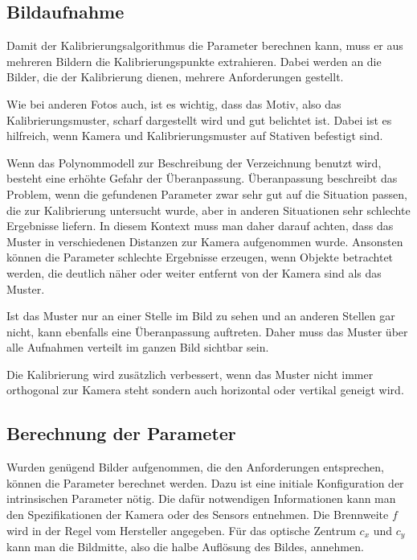 \subsection{Bildaufnahme} %
\label{sub:bildaufnahme}
Damit der Kalibrierungsalgorithmus die Parameter berechnen kann, muss er aus mehreren Bildern die Kalibrierungspunkte extrahieren. Dabei werden an die Bilder, die der Kalibrierung dienen, mehrere Anforderungen gestellt. 

Wie bei anderen Fotos auch, ist es wichtig, dass das Motiv, also das Kalibrierungsmuster, scharf dargestellt wird und gut belichtet ist. Dabei ist es hilfreich, wenn Kamera und Kalibrierungsmuster auf Stativen befestigt sind. 

Wenn das Polynommodell zur Beschreibung der Verzeichnung benutzt wird, besteht eine erhöhte Gefahr der Überanpassung. Überanpassung beschreibt das Problem, wenn die gefundenen Parameter zwar sehr gut auf die Situation passen, die zur Kalibrierung untersucht wurde, aber in anderen Situationen sehr schlechte Ergebnisse liefern. In diesem Kontext muss man daher darauf achten, dass das Muster in verschiedenen Distanzen zur Kamera aufgenommen wurde. Ansonsten können die Parameter schlechte Ergebnisse erzeugen, wenn Objekte betrachtet werden, die deutlich näher oder weiter entfernt von der Kamera sind als das Muster.

Ist das Muster nur an einer Stelle im Bild zu sehen und an anderen Stellen gar nicht, kann ebenfalls eine Überanpassung auftreten. Daher muss das Muster über alle Aufnahmen verteilt im ganzen Bild sichtbar sein. 

Die Kalibrierung wird zusätzlich verbessert, wenn das Muster nicht immer orthogonal zur Kamera steht sondern auch horizontal oder vertikal geneigt wird.

\subsection{Berechnung der Parameter} %
\label{sub:berechnung_der_parameter}
Wurden genügend Bilder aufgenommen, die den Anforderungen entsprechen, können die Parameter berechnet werden. Dazu ist eine initiale Konfiguration der intrinsischen Parameter nötig. Die dafür notwendigen Informationen kann man den Spezifikationen der Kamera oder des Sensors entnehmen. Die Brennweite $f$ wird in der Regel vom Hersteller angegeben. Für das optische Zentrum $c_x$ und $c_y$ kann man die Bildmitte, also die halbe Auflösung des Bildes, annehmen.

